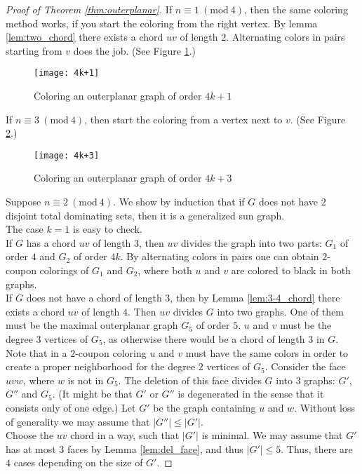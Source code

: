 \begin{proof}[Proof of Theorem \ref{thm:outerplanar}]
  If $n \equiv 1\ (\textrm{mod}\ 4)$, then the same coloring method works, if you
  start the coloring from the right vertex. By lemma \ref{lem:two_chord} there
  exists a chord $uv$ of length $2$. Alternating colors in pairs starting from $v$
  does the job. (See Figure \ref{fig:4k+1}.)
  \begin{figure}[h]
    \centering
    \texttt{[image: 4k+1]}
    \caption{Coloring an outerplanar graph of order $4k + 1$}
    \label{fig:4k+1}
  \end{figure}

  If $n \equiv 3\ (\textrm{mod}\ 4)$, then start the coloring from a vertex next
  to $v$. (See Figure \ref{fig:4k+3}.)
  \begin{figure}[h]
    \centering
    \texttt{[image: 4k+3]}
    \caption{Coloring an outerplanar graph of order $4k + 3$}
    \label{fig:4k+3}
  \end{figure}

  Suppose $n \equiv 2\ (\textrm{mod}\ 4)$. We show by induction that if $G$ does not have $2$
  disjoint total dominating sets, then it is a generalized sun graph.\\
  The case $k = 1$ is easy to check.\\
  If $G$ has a chord $uv$ of length $3$, then $uv$ divides the graph into two parts:
  $G_1$ of order $4$ and $G_2$ of order $4k$. By alternating colors in pairs one can obtain
  $2$-coupon colorings of $G_1$ and $G_2$, where both $u$ and $v$ are colored to black
  in both graphs.\\
  If $G$ does not have a chord of length $3$, then by Lemma \ref{lem:3-4_chord}
  there exists a chord $uv$ of length $4$. Then $uv$ divides $G$ into two graphs.
  One of them must be the maximal outerplanar graph $G_5$ of order $5$. $u$ and $v$
  must be the degree $3$ vertices of $G_5$, as otherwise there would be a chord of length $3$
  in $G$. Note that in a $2$-coupon coloring $u$ and $v$ must have the same colors
  in order to create a proper neighborhood for the degree $2$ vertices of $G_5$.
  Consider the face $uvw$, where $w$ is not in $G_5$. The deletion of this face
  divides $G$ into $3$ graphs: $G'$, $G''$ and $G_5$. (It might be that $G'$ or $G''$ is
  degenerated in the sense that it consists only of one edge.) Let $G'$ be the graph containing
  $u$ and $w$. Without loss of generality we may assume that $|G''| \le |G'|$.\\
  Choose the $uv$ chord in a way, such that $|G'|$ is minimal. We may assume that
  $G'$ has at most $3$ faces by Lemma \ref{lem:del_face}, and thus $|G'| \le 5$.
  Thus, there are $4$ cases depending on the size of $G'$.


\end{proof}
